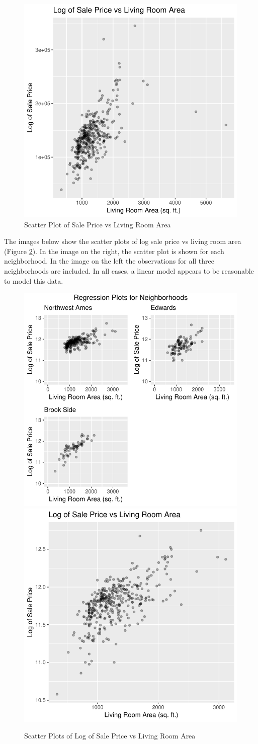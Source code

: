 \documentclass[american,]{article}
\begin{document}
\begin{figure}[htbp]

{\centering \includegraphics[width=0.45\linewidth]{HousePriceRegressionAnalysis_files/figure-latex/scatter-plot-1} 

}

\caption{Scatter Plot of Sale Price vs Living Room Area}\label{fig:scatter-plot}
\end{figure}

The images below show the scatter plots of log sale price vs living room
area (Figure \ref{fig:scatter-plots}). In the image on the right, the
scatter plot is shown for each neighborhood. In the image on the left
the observations for all three neighborhoods are included. In all cases,
a linear model appears to be reasonable to model this data.

\begin{figure}[htbp]

{\centering \includegraphics[width=0.45\linewidth]{HousePriceRegressionAnalysis_files/figure-latex/scatter-plots-1} \includegraphics[width=0.45\linewidth]{HousePriceRegressionAnalysis_files/figure-latex/scatter-plots-2} 

}

\caption{Scatter Plots of Log of Sale Price vs Living Room Area}\label{fig:scatter-plots}
\end{figure}
\end{document}
